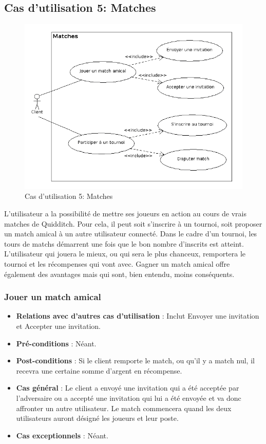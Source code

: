 \documentclass[a4paper,titlepage]{scrreprt}
\begin{document}
  \subsection{Cas d'utilisation 5: Matches}
  \begin{figure}[H]
    \center
    \includegraphics[scale=0.5]{uml/useCaseView/Matches.png}
    \caption{Cas d'utilisation 5: Matches}
  \end{figure}  
    L'utilisateur a la possibilité de mettre ses joueurs en action au cours de vrais matches de Quidditch. Pour cela, il peut soit s'inscrire à un tournoi, soit proposer un match amical à un autre utilisateur connecté. Dans le cadre d'un tournoi, les tours de matchs démarrent une fois que le bon nombre d'inscrits est atteint. L'utilisateur qui jouera le mieux, ou qui sera le plus chanceux, remportera le tournoi et les récompenses qui vont avec. Gagner un match amical offre également des avantages mais qui sont, bien entendu, moins conséquents.

    \subsubsection{Jouer un match amical}
      \begin{itemize}
        \item \textbf{Relations avec d'autres cas d'utilisation}  : Inclut Envoyer une invitation et Accepter une invitation.
        \item \textbf{Pré-conditions} : Néant.
        \item \textbf{Post-conditions} : Si le client remporte le match, ou qu'il y a match nul, il recevra une certaine somme d'argent en récompense.
        \item \textbf{Cas général} : Le client a envoyé une invitation qui a été acceptée par l'adversaire ou a accepté une invitation qui lui a été envoyée et va donc affronter un autre utilisateur. Le match commencera quand les deux utilisateurs auront désigné les joueurs et leur poste.
        \item \textbf{Cas exceptionnels} : Néant.
      \end{itemize}
\end{document}
